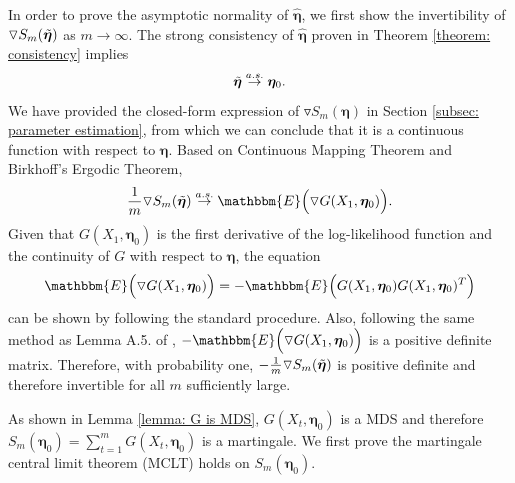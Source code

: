 \documentclass{article}
\theoremstyle{definition}
\begin{document}
In order to prove the asymptotic normality of $\hat{\bm{\eta}}$, we first show the invertibility of $\triangledown S_m(\Tilde{\bm{\eta}})$ as $m \rightarrow \infty$. The strong consistency of $\hat{\bm{\eta}}$ proven in Theorem \ref{theorem: consistency} implies 
\begin{equation*}
    \Tilde{\bm{\eta}} \overset{a.s.}{\rightarrow} \bm{\eta}_0.
\end{equation*}
We have provided the closed-form expression of $\triangledown S_m(\bm{\eta})$ in Section \ref{subsec: parameter estimation}, from which we can conclude that it is a continuous function with respect to $\bm{\eta}$. Based on Continuous Mapping Theorem and Birkhoff's Ergodic Theorem,
\begin{equation}
\label{eq: ergodic of S_m(tilde(eta))}
    \frac{1}{m}\triangledown S_m(\Tilde{\bm{\eta}})\overset{a.s.}{\rightarrow}\mathbbm{E}\Big(\triangledown G(X_1,\bm{\eta}_0)\Big).
\end{equation}
Given that $G(X_1, \bm{\eta}_0)$ is the first derivative of the log-likelihood function and the continuity of $G$ with respect to $\bm{\eta}$, the equation 
\begin{equation*}
    \mathbbm{E}\Big(\triangledown G(X_1,\bm{\eta}_0)\Big) = -\mathbbm{E}\Big(G(X_1,\bm{\eta}_0)G(X_1,\bm{\eta}_0)^T\Big)
\end{equation*}
can be shown by following the standard procedure. Also, following the same method as Lemma A.5. of \cite{gorgi2019bnb}, $-\mathbbm{E}\Big(\triangledown G(X_1,\bm{\eta}_0)\Big)$ is a positive definite matrix. Therefore, with probability one, $-\frac{1}{m}\triangledown S_m(\Tilde{\bm{\eta}})$ is positive definite and therefore invertible for all $m$ sufficiently large.

As shown in Lemma \ref{lemma: G is MDS}, $G(X_t,\bm{\eta}_0)$ is a MDS and therefore $S_m(\bm{\eta}_0) = \sum_{t=1}^m G(X_t, \bm{\eta}_0)$ is a martingale. We first prove the martingale central limit theorem (MCLT) holds on $S_m(\bm{\eta}_0).$ 
\end{document}
